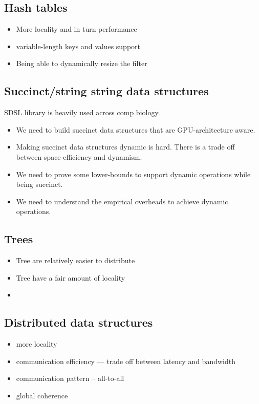 \subsection{Hash tables}
\begin{itemize}
    \item More locality and in turn performance
    \item variable-length keys and values support
    \item Being able to dynamically resize the filter
\end{itemize}

\subsection{Succinct/string string data structures}
SDSL library is heavily used across comp biology.

\begin{itemize}
    \item We need to build succinct data structures that are GPU-architecture aware.
    \item Making succinct data structures dynamic is hard. There is a trade off between space-efficiency and dynamism.
    \item We need to prove some lower-bounds to support dynamic operations while being succinct.
    \item We need to understand the empirical overheads to achieve dynamic operations.
\end{itemize}

\subsection{Trees}
\begin{itemize}
    \item Tree are relatively easier to distribute
    \item Tree have a fair amount of locality
    \item
\end{itemize}

\subsection{Distributed data structures}

\begin{itemize}
    \item more locality
    \item communication efficiency --- trade off between latency and bandwidth
    \item communication pattern -- all-to-all
    \item global coherence
\end{itemize}

